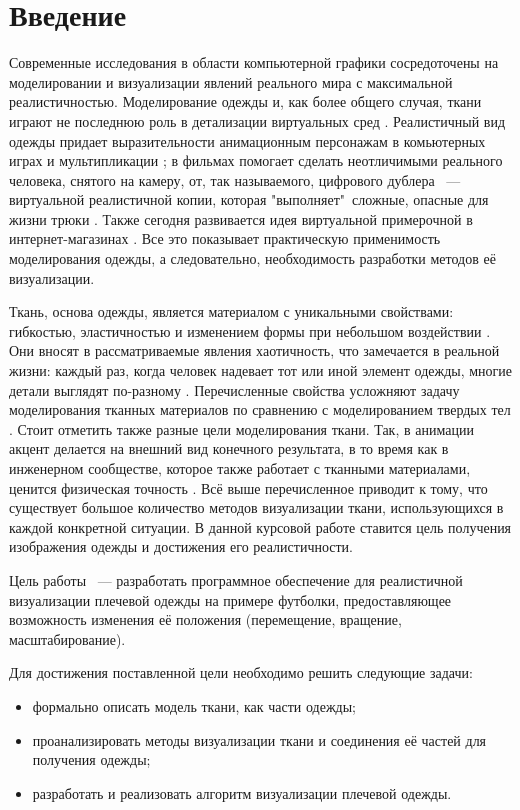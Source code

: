 \chapter*{Введение}

Современные исследования в области компьютерной графики сосредоточены на
моделировании и визуализации явлений реального мира с максимальной
реалистичностью. Моделирование одежды и, как более общего случая, ткани играют
не последнюю роль в детализации виртуальных сред \cite{Simnett2012RealtimeSA}.
Реалистичный вид одежды придает выразительности анимационным персонажам в
комьютерных играх и мультипликации \cite{Zurdo2013AnimatingWB}; в фильмах
помогает сделать неотличимыми реального человека, снятого на камеру, от, так
называемого, цифрового дублера ~--- виртуальной реалистичной копии, которая
"выполняет"\ сложные,  опасные для жизни трюки \cite{Stuyck2018ClothSF}. Также
сегодня развивается идея виртуальной примерочной в интернет-магазинах
\cite{Keckeisen2005PhysicalCS}. Все это показывает практическую применимость
моделирования одежды, а следовательно, необходимость разработки методов её
визуализации.

Ткань, основа одежды, является материалом с уникальными свойствами: гибкостью,
эластичностью и изменением формы при небольшом воздействии
\cite{Shapri2009DynamicCI}. Они вносят в рассматриваемые явления хаотичность,
что  замечается в реальной жизни: каждый раз, когда человек надевает тот или
иной элемент одежды, многие детали выглядят по-разному
\cite{Kieran2005ClothSim}.  Перечисленные свойства усложняют задачу
моделирования тканных материалов по сравнению с моделированием твердых тел
\cite{Ng1996ComputerGT}. Стоит отметить также разные цели моделирования ткани.
Так, в анимации акцент делается на внешний вид конечного результата, в то время
как в инженерном сообществе, которое также работает с тканными материалами,
ценится физическая точность \cite{Stuyck2018ClothSF}. Всё выше перечисленное
приводит к тому, что существует большое количество методов визуализации ткани,
использующихся в каждой конкретной ситуации. В данной курсовой работе ставится
цель получения изображения одежды и достижения его реалистичности.

Цель работы ~--- разработать программное обеспечение для реалистичной
визуализации плечевой одежды на примере футболки, предоставляющее возможность
изменения её положения (перемещение, вращение, масштабирование).

Для достижения поставленной цели необходимо решить следующие задачи:
\begin{itemize}[left=\parindent]
    \item  формально описать модель ткани, как части одежды;
    \item  проанализировать методы визуализации ткани и соединения её частей
           для получения одежды;
    \item  разработать и реализовать алгоритм визуализации плечевой одежды.
\end{itemize}

